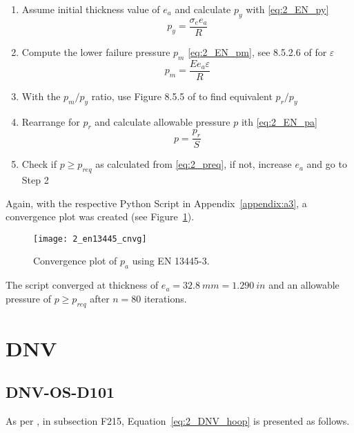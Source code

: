 \begin{enumerate}
	\item Assume initial thickness value of $e_a$ and calculate $p_y$ with \ref{eq:2_EN_py}
		\begin{equation}
			\label{eq:2_EN_py}
			p_y = \frac{\sigma_e e_a}{R}
		\end{equation}
	\item Compute the lower failure pressure $p_m$ \ref{eq:2_EN_pm}, see 8.5.2.6 of \citep{EN134453} for $\varepsilon$
		\begin{equation}
			\label{eq:2_EN_pm}
			p_m = \frac{E e_a  \varepsilon}{R}
		\end{equation}
	\item With the $p_m/p_y$ ratio, use Figure 8.5.5 of \citep{EN134453} to find equivalent $p_r/p_y$
	\item Rearrange for $p_r$ and calculate allowable pressure $p$ ith \ref{eq:2_EN_pa}
		\begin{equation}
			\label{eq:2_EN_pa}
			p = \frac{p_r}{S}
		\end{equation}
	\item Check if $p \geq p_{req}$ as calculated from \ref{eq:2_preq}, if not, increase $e_a$ and go to Step 2\\
\end{enumerate}

Again, with the respective Python Script in Appendix~\ref{appendix:a3}, a convergence plot was created (see Figure~\ref{fig:2_en13445_cnvg}).
\begin{figure}[H]
    \centering
    \texttt{[image: 2\_en13445\_cnvg]}
    \caption{Convergence plot of $p_a$ using EN 13445-3.}
    \label{fig:2_en13445_cnvg}
\end{figure}

The script converged at thickness of $e_a = 32.8\ mm = 1.290\ in$ and an allowable pressure of $p\geq p_{req}$ after $n=80$ iterations. 

\section{DNV}

\subsection{DNV-OS-D101}

As per \citep{DNVOSD101}, in subsection F215, Equation~\ref{eq:2_DNV_hoop} is presented as follows.

